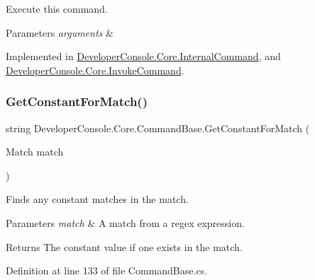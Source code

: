 Execute this command. 


\begin{DoxyParams}{Parameters}
{\em arguments} & \\
\hline
\end{DoxyParams}


Implemented in \hyperlink{class_developer_console_1_1_core_1_1_internal_command_a1099028980b225c379bae7b3eab35d20}{Developer\+Console.\+Core.\+Internal\+Command}, and \hyperlink{class_developer_console_1_1_core_1_1_invoke_command_a3c7631154759c3304ae757cbc437d27d}{Developer\+Console.\+Core.\+Invoke\+Command}.

\mbox{\label{class_developer_console_1_1_core_1_1_command_base_ab91af9ff56ca90d0c2e23113840cbc27}} 
\subsubsection{\texorpdfstring{Get\+Constant\+For\+Match()}{GetConstantForMatch()}}
{\footnotesize\ttfamily string Developer\+Console.\+Core.\+Command\+Base.\+Get\+Constant\+For\+Match (\begin{DoxyParamCaption}\item[{Match}]{match }\end{DoxyParamCaption})\hspace{0.3cm}{\ttfamily [protected]}}



Finds any constant matches in the match. 


\begin{DoxyParams}{Parameters}
{\em match} & A match from a regex expression. \\
\hline
\end{DoxyParams}
\begin{DoxyReturn}{Returns}
The constant value if one exists in the match. 
\end{DoxyReturn}


Definition at line 133 of file Command\+Base.\+cs.

\mbox{\label{class_developer_console_1_1_core_1_1_command_base_a63fcbc0b16344db48f1dfaab96d86759}} 
